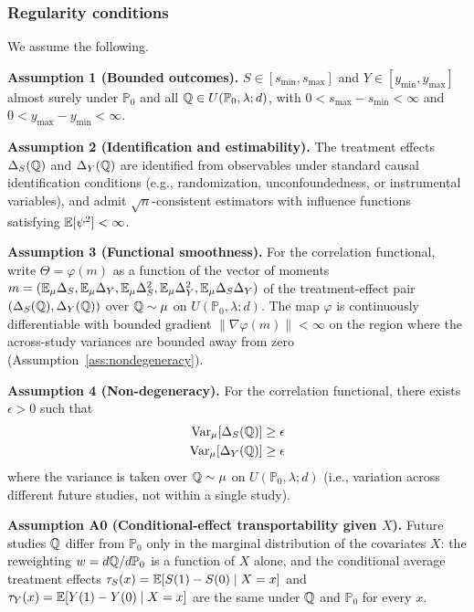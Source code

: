 \documentclass{article}
\newcommand{\PP}{\mathbb{P}}
\begin{document}
\subsubsection{Regularity conditions}
We assume the following.

\noindent\textbf{Assumption 1 (Bounded outcomes).}\label{ass:bounded}
$S \in [s_{\min}, s_{\max}]$ and $Y \in [y_{\min}, y_{\max}]$ almost surely
under $\PP_0$ and all $\Q \in U(\PP_0, \lambda; d)$, with
$0 < s_{\max} - s_{\min} < \infty$ and $0 < y_{\max} - y_{\min} < \infty$.

\noindent\textbf{Assumption 2 (Identification and estimability).}\label{ass:identification}
The treatment effects $\Delta_S(\mathbb{Q})$ and $\Delta_Y(\mathbb{Q})$ are identified from
observables under standard causal identification conditions (e.g., randomization,
unconfoundedness, or instrumental variables), and admit $\sqrt{n}$-consistent
estimators with influence functions satisfying $\mathbb{E}[\psi^2] < \infty$.

\noindent\textbf{Assumption 3 (Functional smoothness).}\label{ass:smoothness}
For the correlation functional, write $\Theta = \varphi(m)$ as a function of the
vector of moments
$m = (\mathbb{E}_\mu \Delta_S, \mathbb{E}_\mu \Delta_Y, \mathbb{E}_\mu \Delta_S^2, \mathbb{E}_\mu \Delta_Y^2, \mathbb{E}_\mu \Delta_S\Delta_Y)$
of the treatment-effect pair $(\Delta_S(\mathbb{Q}), \Delta_Y(\mathbb{Q}))$ over $\mathbb{Q} \sim \mu$ on
$U(\PP_0, \lambda; d)$. The map $\varphi$ is continuously differentiable with
bounded gradient $\|\nabla\varphi(m)\| < \infty$ on the region where the
across-study variances are bounded away from zero (Assumption~\ref{ass:nondegeneracy}).

\noindent\textbf{Assumption 4 (Non-degeneracy).}\label{ass:nondegeneracy}
For the correlation functional, there exists $\epsilon > 0$ such that
\begin{align*}
    \operatorname{Var}_\mu[\Delta_S(\mathbb{Q})] &\geq \epsilon\\
    \operatorname{Var}_\mu[\Delta_Y(\mathbb{Q})] &\geq \epsilon
\end{align*}
where the variance is taken over $\mathbb{Q} \sim \mu$ on $U(\PP_0, \lambda; d)$
(i.e., variation across different future studies, not within a single study).

\noindent\textbf{Assumption A0 (Conditional-effect transportability given $X$).}\label{ass:A0}
Future studies $\mathbb{Q}$ differ from $\PP_0$ only in the marginal distribution of the
covariates $X$: the reweighting $w = d\Q/d\PP_0$ is a function of $X$ alone, and
the conditional average treatment effects $\tau_S(x) = \mathbb{E}[S(1)-S(0)\mid X=x]$ and
$\tau_Y(x) = \mathbb{E}[Y(1)-Y(0)\mid X=x]$ are the same under $\mathbb{Q}$ and $\PP_0$ for
every $x$.
\end{document}
